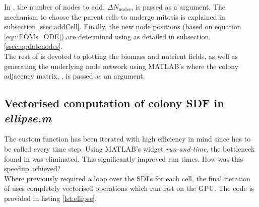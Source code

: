 In , the number of nodes to add, $\Delta N_{\textrm{nodes}}$, is passed 
as a argument. The mechanism to choose the parent cells to undergo mitosis is 
explained in subsection \ref{ssec:addCell}. Finally, 
the new node positions (based on equation \ref{eqn:EOMs_ODE}) are determined 
using  as detailed in subsection \ref{ssec:updatenodes}.
\\

The rest of  is devoted to plotting the biomass and nutrient 
fields, as well as generating the underlying node network using MATLAB's 
 where the colony adjacency matrix, ,
is passed as an argument.


\subsection{Vectorised computation of colony SDF in \textit{ellipse.m}}\label{ssec:ellipse}
The custom function  has been iterated
with high efficiency in mind since  has to be called 
every time step. Using MATLAB's widget \textit{run-and-time}, the bottleneck found
in  was eliminated. This significantly 
improved run times. How was this speedup achieved?
\\

Where previously  required a  loop over the SDFs for 
each cell, the final iteration of  uses 
completely vectorised operations which run fast on the GPU. The code is 
provided in listing \ref{lst:ellipse}.

